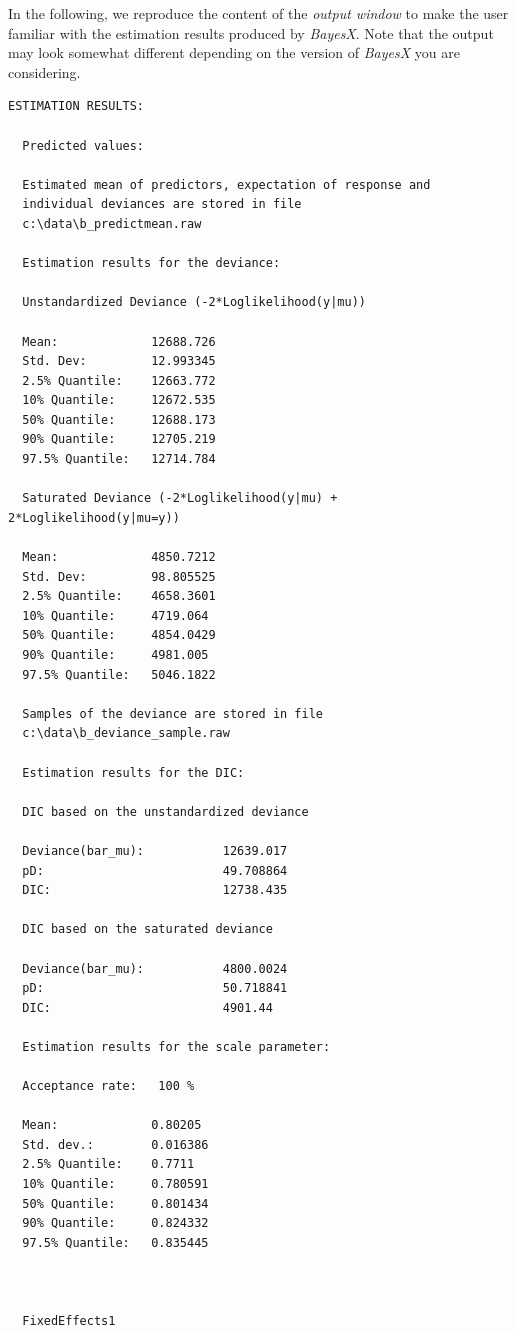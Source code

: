 In the following, we reproduce the content of the {\it output window} to make the user familiar with the estimation results
produced by {\it BayesX}. Note that the output may look somewhat different depending on the version of {\it BayesX} you are
considering.

\footnotesize
\begin{verbatim}
ESTIMATION RESULTS:

  Predicted values:

  Estimated mean of predictors, expectation of response and
  individual deviances are stored in file
  c:\data\b_predictmean.raw

  Estimation results for the deviance:

  Unstandardized Deviance (-2*Loglikelihood(y|mu))

  Mean:             12688.726
  Std. Dev:         12.993345
  2.5% Quantile:    12663.772
  10% Quantile:     12672.535
  50% Quantile:     12688.173
  90% Quantile:     12705.219
  97.5% Quantile:   12714.784

  Saturated Deviance (-2*Loglikelihood(y|mu) + 2*Loglikelihood(y|mu=y))

  Mean:             4850.7212
  Std. Dev:         98.805525
  2.5% Quantile:    4658.3601
  10% Quantile:     4719.064
  50% Quantile:     4854.0429
  90% Quantile:     4981.005
  97.5% Quantile:   5046.1822

  Samples of the deviance are stored in file
  c:\data\b_deviance_sample.raw

  Estimation results for the DIC:

  DIC based on the unstandardized deviance

  Deviance(bar_mu):           12639.017
  pD:                         49.708864
  DIC:                        12738.435

  DIC based on the saturated deviance

  Deviance(bar_mu):           4800.0024
  pD:                         50.718841
  DIC:                        4901.44

  Estimation results for the scale parameter:

  Acceptance rate:   100 %

  Mean:             0.80205
  Std. dev.:        0.016386
  2.5% Quantile:    0.7711
  10% Quantile:     0.780591
  50% Quantile:     0.801434
  90% Quantile:     0.824332
  97.5% Quantile:   0.835445



  FixedEffects1



\end{verbatim}
